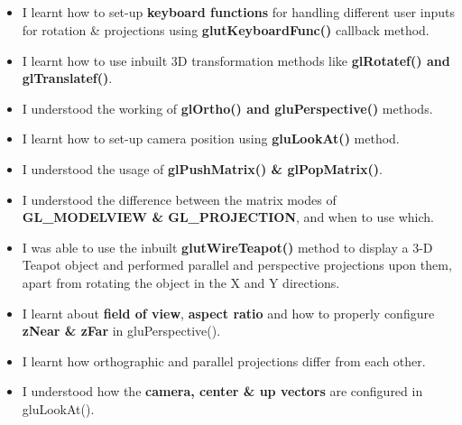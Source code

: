 \documentclass[12pt, a4]{article}
\begin{document}
\subsection*{}
\begin{itemize}
\item I learnt how to set-up \textbf{keyboard functions} for handling different user inputs for rotation \& projections using \textbf{glutKeyboardFunc()} callback method.
\item I learnt how to use inbuilt 3D transformation methods like \textbf{glRotatef() and glTranslatef()}.
\item I understood the working of \textbf{glOrtho() and gluPerspective()} methods.
\item I learnt how to set-up camera position using \textbf{gluLookAt()} method.
\item I understood the usage of \textbf{glPushMatrix() \& glPopMatrix()}.
\item I understood the difference between the matrix modes of \textbf{GL\_MODELVIEW \& GL\_PROJECTION}, and when to use which.
\item I was able to use the inbuilt \textbf{glutWireTeapot()} method to display a 3-D Teapot object and performed parallel and perspective projections upon them, apart from rotating the object in the X and Y directions.
\item I learnt about \textbf{field of view}, \textbf{aspect ratio} and how to properly configure \textbf{zNear \& zFar} in gluPerspective().
\item I learnt how orthographic and parallel projections differ from each other.
\item I understood how the \textbf{camera, center \& up vectors} are configured in gluLookAt().
\end{itemize}
\end{document}
